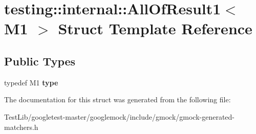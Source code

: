 \hypertarget{structtesting_1_1internal_1_1AllOfResult1}{}\section{testing\+:\+:internal\+:\+:All\+Of\+Result1$<$ M1 $>$ Struct Template Reference}
\label{structtesting_1_1internal_1_1AllOfResult1}
\subsection*{Public Types}
\begin{DoxyCompactItemize}
\item 
\mbox{\label{structtesting_1_1internal_1_1AllOfResult1_a19b95d4ddf7f4044a78665d9e253db10}} 
typedef M1 {\bfseries type}
\end{DoxyCompactItemize}


The documentation for this struct was generated from the following file\+:\begin{DoxyCompactItemize}
\item 
Test\+Lib/googletest-\/master/googlemock/include/gmock/gmock-\/generated-\/matchers.\+h\end{DoxyCompactItemize}
